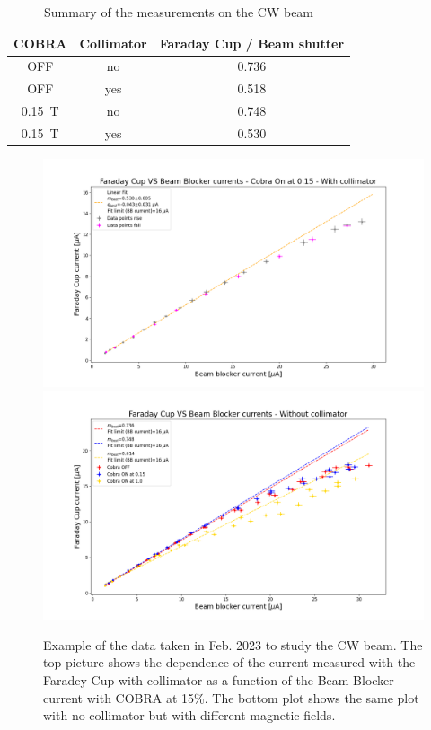 \begin{refsection}
        \begin{table}[]
            \centering
            \begin{tabular}{c|c|c}
                \hline
                COBRA & Collimator & Faraday Cup / Beam shutter \\
                \hline
                \hline
                OFF & no & 0.736 \\
                OFF & yes & 0.518 \\
                \SI{0.15}{T} & no & 0.748 \\
                \SI{0.15}{T} & yes & 0.530 \\
                \hline
            \end{tabular}
            \caption{Summary of the measurements on the CW beam}
            \label{tab:X17:beam}
        \end{table}

        \begin{figure}
            \centering
            \includegraphics[width = \textwidth]{Figures/X17/H2+/Faraday_Cup_VS_Beam_Blocker_currents_-_Cobra_On_at_0.15_-_With_collimator.png}\\
            \includegraphics[width = \textwidth]{Figures/X17/H2+/Faraday_Cup_VS_Beam_Blocker_currents_-_Without_collimator.png}
            \caption{Example of the data taken in Feb. 2023 to study the CW beam. The top picture shows the dependence of the current measured with the Faradey Cup with collimator as a function of the Beam Blocker current with COBRA at 15\%. The bottom plot shows the same plot with no collimator but with different magnetic fields.}
            \label{fig:X17:H2+}
        \end{figure}
    

\end{refsection}
